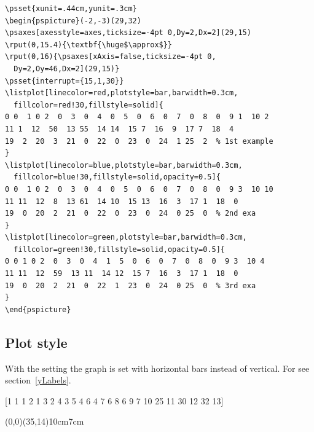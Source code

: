 \documentclass[11pt,english,BCOR=10mm,DIV=12,bibliography=totoc,parskip=false,headings=small,
    headinclude=false,footinclude=false,twoside]{pst-doc}
\begin{document}
\begin{lstlisting}
\psset{xunit=.44cm,yunit=.3cm}
\begin{pspicture}(-2,-3)(29,32)
\psaxes[axesstyle=axes,ticksize=-4pt 0,Dy=2,Dx=2](29,15)
\rput(0,15.4){\textbf{\huge$\approx$}}
\rput(0,16){\psaxes[xAxis=false,ticksize=-4pt 0,
  Dy=2,Oy=46,Dx=2](29,15)}
\psset{interrupt={15,1,30}}
\listplot[linecolor=red,plotstyle=bar,barwidth=0.3cm,
  fillcolor=red!30,fillstyle=solid]{
0 0  1 0 2  0  3  0  4  0  5  0  6  0  7  0  8  0  9 1  10 2  
11 1  12  50  13 55  14 14  15 7  16  9  17 7  18  4 
19  2  20  3  21  0  22  0  23  0  24  1 25  2  % 1st example
}
\listplot[linecolor=blue,plotstyle=bar,barwidth=0.3cm,
  fillcolor=blue!30,fillstyle=solid,opacity=0.5]{
0 0  1 0 2  0  3  0  4  0  5  0  6  0  7  0  8  0  9 3  10 10  
11 11  12  8  13 61  14 10  15 13  16  3  17 1  18  0 
19  0  20  2  21  0  22  0  23  0  24  0 25  0  % 2nd exa
}
\listplot[linecolor=green,plotstyle=bar,barwidth=0.3cm,
  fillcolor=green!30,fillstyle=solid,opacity=0.5]{
0 0 1 0 2  0  3  0  4  1  5  0  6  0  7  0  8  0  9 3  10 4  
11 11  12  59  13 11  14 12  15 7  16  3  17 1  18  0 
19  0  20  2  21  0  22  1  23  0  24  0 25  0  % 3rd exa
}
\end{pspicture}
\end{lstlisting}



\subsection{Plot style }\label{options:ybar}
With the setting  the graph is set with horizontal bars instead
of vertical. For  see section~\ref{yLabels}.

\begin{center}
\savedata{\data}[1 1  1 2  1 3  2 4  3 5 4 6  4 7  6 8  6 9  7 10  25 11 30 12 32 13]

\begin{psgraph}[axesstyle=frame,labels=x,ticksize=-4pt 0,Dx=5](0,0)(35,14){10cm}{7cm}
  \listplot[plotstyle=ybar,fillcolor=blue!20,linecolor=blue,barwidth=4mm,fillstyle=solid]{\data}
  \listplot[plotstyle=xvalues,labelsep=5pt]{\data}
\end{psgraph}
\end{center}
\end{document}
